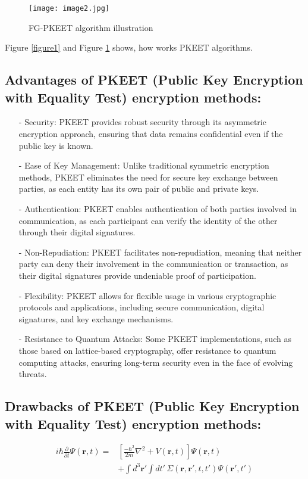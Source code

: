 \documentclass[12pt]{article}
\begin{document}
\begin{figure}[H]
    \centering
    \texttt{[image: image2.jpg]}
    \caption{FG-PKEET algorithm illustration}
    \label{figure2}
\end{figure}
Figure \ref{figure1} and Figure \ref{figure2} shows, how works PKEET algorithms.
\subsection{Advantages of PKEET (Public Key Encryption with Equality Test) encryption methods:}

\begin{itemize}
    \item [-]Security: PKEET provides robust security through its asymmetric encryption approach, ensuring that data remains confidential even if the public key is known.
    \item [-]Ease of Key Management: Unlike traditional symmetric encryption methods, PKEET eliminates the need for secure key exchange between parties, as each entity has its own pair of public and private keys.
    \item [-]Authentication: PKEET enables authentication of both parties involved in communication, as each participant can verify the identity of the other through their digital signatures.
    \item[-]Non-Repudiation: PKEET facilitates non-repudiation, meaning that neither party can deny their involvement in the communication or transaction, as their digital signatures provide undeniable proof of participation.
    \item[-]Flexibility: PKEET allows for flexible usage in various cryptographic protocols and applications, including secure communication, digital signatures, and key exchange mechanisms.
    \item[-]Resistance to Quantum Attacks: Some PKEET implementations, such as those based on lattice-based cryptography, offer resistance to quantum computing attacks, ensuring long-term security even in the face of evolving threats.

\end{itemize}

\subsection{Drawbacks of PKEET (Public Key Encryption with Equality Test) encryption methods:} 


\begin{equation*}
\begin{split}
i\hbar\frac{\partial}{\partial t}\Psi(\mathbf{r},t) = & \left[ \frac{-\hbar^2}{2m}\nabla^2 + V(\mathbf{r},t) \right] \Psi(\mathbf{r},t) \\
 &+ \int d^3\mathbf{r}' \int dt' \, \Sigma(\mathbf{r},\mathbf{r}',t,t') \Psi(\mathbf{r}',t') 
\end{split}
\end{equation*}
\end{document}
